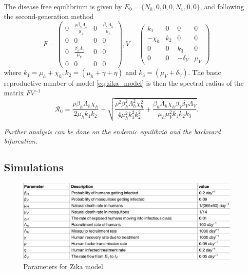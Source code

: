 \documentclass{book}
\begin{document}
The disease free equilibrium is given by $E_0=\{N_h,0,0,0,N_v,0,0\}$, and following the second-generation method
$$
F=\left(\begin{array}{cccc}
0 & \frac{\rho \beta_{h} \Lambda_{h}}{\mu_{h}} & 0 & \frac{\beta_{h} \Lambda_{h}}{\mu_{h}} \\
0 & 0 & 0 & 0 \\
0 & \frac{\beta_{v} \Lambda_{v}}{\mu_{Y}} & 0 & 0 \\
0 & 0 & 0 & 0
\end{array}\right), V=\left(\begin{array}{cccc}
k_{1} & 0 & 0 & 0 \\
-\chi_{h} & k_{2} & 0 & 0 \\
0 & 0 & k_{3} & 0 \\
0 & 0 & -\delta_{V} & \mu_{V}
\end{array}\right)
$$
where $k_{1}=\mu_{h}+\chi_{h}, k_{2}=\left(\mu_{h}+\gamma+\eta\right)$ and $k_{3}=\left(\mu_{V}+\delta_{V}\right)$. The basic reproductive number of model \eqref{eq:zika_model} is  then the spectral radius of the matrix $FV^{-1}$
$$\mathcal{R}_{0}=\frac{\rho \beta_{h} \Lambda_{h} \chi_{h}}{2 \mu_{h} k_{1} k_{2}}+\sqrt{\frac{\rho^{2} \beta_{h}^{2} \Lambda_{h}^{2} \chi_{h}^{2}}{4 \mu_{h}^{2} k_{1}^{2} k_{2}^{2}}+\frac{\beta_{h} \Lambda_{h} \chi_{h} \beta_{V} \delta_{V} \Lambda_{V}}{\mu_{h} \mu_{V}^{2} k_{1} k_{2} k_{3}}}.$$

{\it Further analysis can be done on the endemic equilibria and the backward bifurcation.}

\subsection*{Simulations}

\begin{figure}[H]
    \centering
    \includegraphics[scale=0.25]{zika1}
    \caption{Parameters for Zika model}
    \label{fig:zika_params}
\end{figure}
\end{document}
